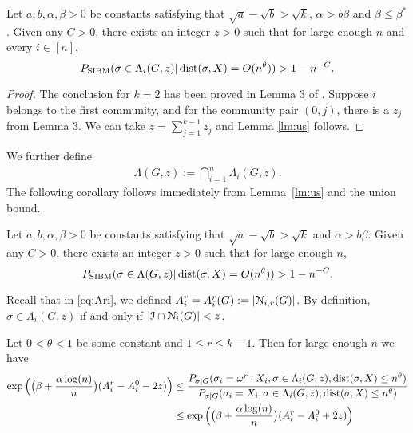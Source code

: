 \documentclass{article}
\begin{document}
\begin{lemma} \label{lm:us}
	Let $a,b,\alpha,\beta> 0$ be constants satisfying that $\sqrt{a}-\sqrt{b} > \sqrt{k}$, $\alpha>b\beta$ and $\beta\le \beta^\ast$.
	Given any $C>0$, there exists an integer $z>0$ such that for large enough $n$ and every $i\in[n]$, 
	\begin{equation} \label{eq:zr}
	P_{\operatorname{SIBM}} (\sigma\in \Lambda_i(G, z)
	| \operatorname{dist}(\sigma, X) = O(n^{\theta}))
	> 1 - n^{-C} .
	\end{equation}
\end{lemma}
\begin{proof}
	The conclusion for $k=2$ has been proved in Lemma 3 of \cite{ye2020exact}. Suppose $i$ belongs to the first community, and for the community
	pair $(0, j)$, there is a $z_{j}$ from Lemma 3.
	We can take $z = \sum_{j=1}^{k-1} z_j$ and Lemma \ref{lm:us} follows.
\end{proof}
We further define 
\begin{align*}
\Lambda(G, z) :=
\bigcap_{i=1}^n
\Lambda_i(G, z) .
\end{align*}
The following corollary follows immediately from Lemma~\ref{lm:us} and the union bound.
\begin{corollary} \label{cr:1}
	Let $a,b,\alpha,\beta> 0$ be constants satisfying that $\sqrt{a}-\sqrt{b} > \sqrt{k}$ and $\alpha>b\beta$.
	Given any $C>0$, there exists an integer $z>0$ such that for large enough $n$, 
	$$
	P_{\operatorname{SIBM}} (\sigma\in \Lambda(G, z)
	|  \operatorname{dist}(\sigma, X) = O(n^{\theta}))
	> 1 - n^{-C} .
	$$
\end{corollary}

Recall that in \eqref{eq:Ari}, we defined $A^r_i=A^r_i(G):=|\mathcal{N}_{i,r}(G)|$.
By definition, $\sigma \in  \Lambda_i(G,z)$ if and only if $|\mathcal{I}\cap \mathcal{N}_i(G)| < z$.


\begin{lemma} \label{lm:et}
	Let $0<\theta<1$ be some constant and $1\leq r \leq k-1$. Then for large enough $n$ we have
	\begin{align*}
	\exp\Big(\big(\beta+\frac{\alpha\log(n)}{n} \big) (A^r_i-A^0_i - 2z) \Big) & \le 
	\frac{P_{\sigma|G}(\sigma_i= \omega^r \cdot X_i, \sigma\in \Lambda_i(G,z) ,\operatorname{dist}(\sigma, X) \le n^{\theta} ) } 
	{ P_{\sigma|G}(\sigma_i=X_i, \sigma\in \Lambda_i(G,z) ,\operatorname{dist}(\sigma, X) \le n^{\theta} ) } \\
	& \le \exp\Big(\big(\beta+\frac{\alpha\log(n)}{n} \big) (A^r_i-A^0_i + 2z) \Big)
	\end{align*}
\end{lemma}
\end{document}
